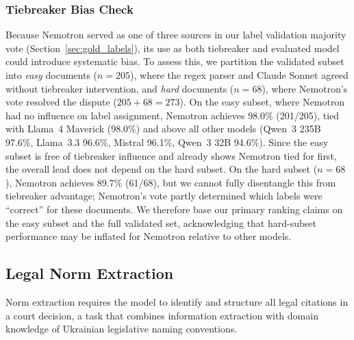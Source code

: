 \documentclass[11pt,a4paper]{article}
\begin{document}
\subsubsection{Tiebreaker Bias Check}
\label{sec:tiebreaker_bias}

Because Nemotron served as one of three sources in our label validation majority vote (Section~\ref{sec:gold_labels}), its use as both tiebreaker and evaluated model could introduce systematic bias. To assess this, we partition the validated subset into \emph{easy} documents ($n{=}205$), where the regex parser and Claude Sonnet agreed without tiebreaker intervention, and \emph{hard} documents ($n{=}68$), where Nemotron's vote resolved the dispute ($205 + 68 = 273$). On the easy subset, where Nemotron had no influence on label assignment, Nemotron achieves 98.0\% (201/205), tied with Llama~4 Maverick (98.0\%) and above all other models (Qwen~3 235B 97.6\%, Llama~3.3 96.6\%, Mistral 96.1\%, Qwen~3 32B 94.6\%). Since the easy subset is free of tiebreaker influence and already shows Nemotron tied for first, the overall lead does not depend on the hard subset. On the hard subset ($n{=}68$), Nemotron achieves 89.7\% (61/68), but we cannot fully disentangle this from tiebreaker advantage; Nemotron's vote partly determined which labels were ``correct'' for these documents. We therefore base our primary ranking claims on the easy subset and the full validated set, acknowledging that hard-subset performance may be inflated for Nemotron relative to other models.

\subsection{Legal Norm Extraction}
\label{sec:results_norms}

Norm extraction requires the model to identify and structure all legal citations in a court decision, a task that combines information extraction with domain knowledge of Ukrainian legislative naming conventions.
\end{document}
